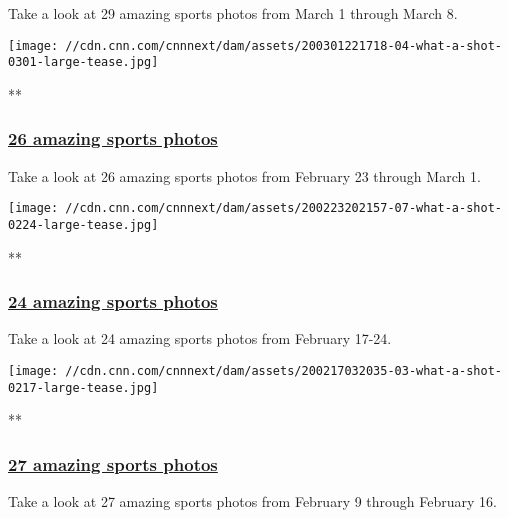 Take a look at 29 amazing sports photos from March 1 through March 8.

\href{/2020/03/02/sport/gallery/what-a-shot-0301/index.html}{}

\texttt{[image: //cdn.cnn.com/cnnnext/dam/assets/200301221718-04-what-a-shot-0301-large-tease.jpg]}

**

\hypertarget{26-amazing-sports-photos}{%
\subsubsection{\texorpdfstring{\href{/2020/03/02/sport/gallery/what-a-shot-0301/index.html}{26
amazing sports
photos}}{26 amazing sports photos}}\label{26-amazing-sports-photos}}

Take a look at 26 amazing sports photos from February 23 through March
1.

\href{/2020/02/23/sport/gallery/what-a-shot-0224/index.html}{}

\texttt{[image: //cdn.cnn.com/cnnnext/dam/assets/200223202157-07-what-a-shot-0224-large-tease.jpg]}

**

\hypertarget{24-amazing-sports-photos}{%
\subsubsection{\texorpdfstring{\href{/2020/02/23/sport/gallery/what-a-shot-0224/index.html}{24
amazing sports
photos}}{24 amazing sports photos}}\label{24-amazing-sports-photos}}

Take a look at 24 amazing sports photos from February 17-24.

\href{/2020/02/17/sport/gallery/what-a-shot-0217/index.html}{}

\texttt{[image: //cdn.cnn.com/cnnnext/dam/assets/200217032035-03-what-a-shot-0217-large-tease.jpg]}

**

\hypertarget{27-amazing-sports-photos}{%
\subsubsection{\texorpdfstring{\href{/2020/02/17/sport/gallery/what-a-shot-0217/index.html}{27
amazing sports
photos}}{27 amazing sports photos}}\label{27-amazing-sports-photos}}

Take a look at 27 amazing sports photos from February 9 through February
16.

\href{/2020/02/10/sport/gallery/what-a-shot-0209/index.html}{}

